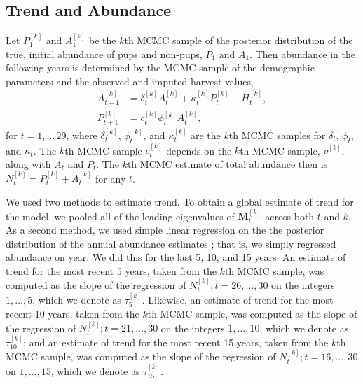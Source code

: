 \documentclass[]{risa}\usepackage[]{graphicx}\usepackage[]{color}
\def\bM{\mathbf{M}}
\begin{document}

\subsection{Trend and Abundance} \label{sec:trend}

Let $P_1^{[k]}$ and $A_1^{[k]}$ be the $k$th MCMC sample of the posterior distribution of the true, initial abundance of pups and non-pups, $P_1$ and $A_1$. Then abundance in the following years is determined by the MCMC sample of the demographic parameters and the observed and imputed harvest values,
\begin{align*}
    A^{[k]}_{t+1} &= \delta^{[k]}_tA^{[k]}_t + \kappa^{[k]}_t P^{[k]}_t - H^{[k]}_t, \\
    P^{[k]}_{t+1} &= c^{[k]}_t\phi^{[k]}_t A^{[k]}_t,
\end{align*}
for $t = 1,\ldots\,29$, where $\delta_t^{[k]}$, $\phi_t^{[k]}$, and $\kappa_t^{[k]}$ are the $k$th MCMC samples for $\delta_t$, $\phi_t$, and $\kappa_t$. The $k$th MCMC sample $c^{[k]}_t$ depends on the $k$th MCMC sample, $\rho^{[k]}$, along with $A_t$ and $P_t$. The $k$th MCMC estimate of total abundance then is $N_t^{[k]} = P_t^{[k]} + A_t^{[k]}$ for any $t$.

We used two methods to estimate trend.  To obtain a global estimate of trend for the model, we pooled all of the leading eigenvalues of $\bM_t^{[k]}$ across both $t$ and $k$. As a second method, we used simple linear regression on the the posterior distribution of the annual abundance estimates \citep{John:Frit:agtr:2014}; that is, we simply regressed abundance on year.  We did this for the last 5, 10, and 15 years. An estimate of trend for the most recent 5 years, taken from the $k$th MCMC sample, was computed as the slope of the regression of $N^{[k]}_t;t=26,\ldots,30$ on the integers $1,\ldots,5$, which we denote as $\tau^{[k]}_5$.  Likewise, an estimate of trend for the most recent 10 years, taken from the $k$th MCMC sample, was computed as the slope of the regression of $N^{[k]}_t;t=21,\ldots,30$ on the integers $1,\ldots,10$, which we denote as $\tau^{[k]}_{10}$; and an estimate of trend for the most recent 15 years, taken from the $k$th MCMC sample, was computed as the slope of the regression of $N^{[k]}_t;t=16,\ldots,30$ on $1,\ldots,15$, which we denote as $\tau^{[k]}_{15}$.
\end{document}
